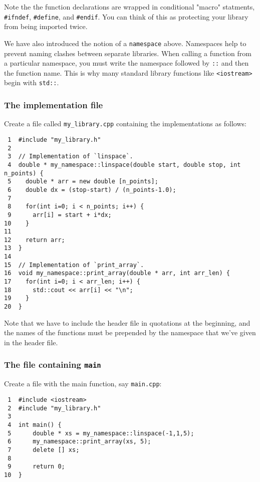 \documentclass[11pt]{article}
\begin{document}
Note the the function declarations are wrapped in conditional "macro" 
statments, \texttt{\#ifndef}, \texttt{\#define}, and \texttt{\#endif}. You can think of this 
as protecting your library from being imported twice.

We have also introduced the notion of a \texttt{namespace} above. Namespaces 
help to prevent naming clashes between separate libraries. When calling 
a function from a particular namespace, you must write the namespace 
followed by \texttt{::} and then the function name. This is why many standard 
library functions like \texttt{<iostream>} begin with \texttt{std::}.

\subsubsection{The implementation file}
\label{sec:orgheadline43}

Create a file called \texttt{my\_library.cpp} containing the implementations as follows:

\begin{verbatim}
 1  #include "my_library.h"
 2  
 3  // Implementation of `linspace`.
 4  double * my_namespace::linspace(double start, double stop, int n_points) {
 5    double * arr = new double [n_points];
 6    double dx = (stop-start) / (n_points-1.0);
 7  
 8    for(int i=0; i < n_points; i++) {
 9      arr[i] = start + i*dx;
10    }
11  
12    return arr;
13  }
14  
15  // Implementation of `print_array`.
16  void my_namespace::print_array(double * arr, int arr_len) {
17    for(int i=0; i < arr_len; i++) {
18      std::cout << arr[i] << "\n";
19    }
20  }
\end{verbatim}

Note that we have to include the header file in quotations at the beginning, 
and the names of the functions must be prepended by the namespace that we've 
given in the header file.

\subsubsection{The file containing \texttt{main}}
\label{sec:orgheadline44}

Create a file with the main function, say \texttt{main.cpp}:

\begin{verbatim}
 1  #include <iostream>
 2  #include "my_library.h"
 3  
 4  int main() {
 5      double * xs = my_namespace::linspace(-1,1,5);
 6      my_namespace::print_array(xs, 5);
 7      delete [] xs;
 8  
 9      return 0;
10  }
\end{verbatim}
\end{document}
